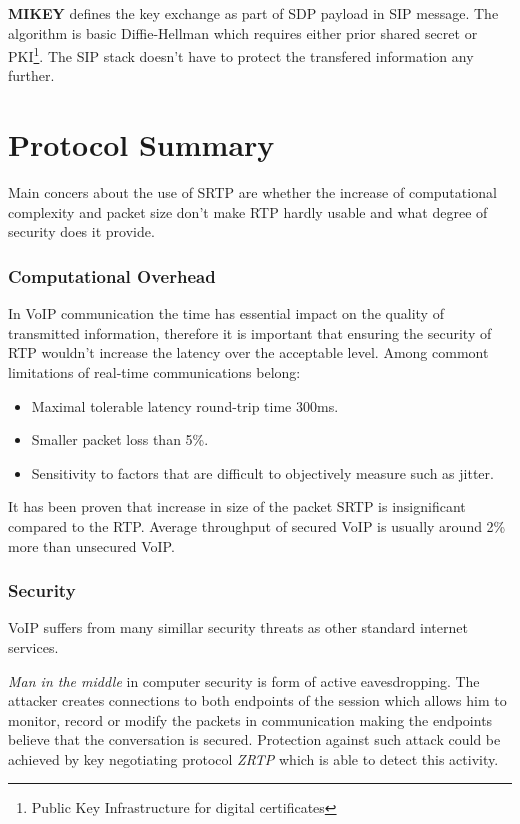 \textbf{MIKEY} defines the key exchange as part of SDP payload in SIP message.
The algorithm is basic Diffie-Hellman which requires either prior shared secret
or PKI\footnote{ Public Key Infrastructure for digital certificates}. The SIP 
stack doesn't have to protect the transfered information any further.



\section{Protocol Summary}
Main concers about the use of SRTP are whether the increase of computational
complexity and packet size don't make RTP hardly usable and what degree of
security does it provide.

\subsubsection*{Computational Overhead}
In VoIP communication the time has essential impact on the quality of
transmitted information, therefore it is important that ensuring the 
security of RTP wouldn't increase the latency over the acceptable level.
Among commont limitations of real-time communications 
belong\cite{perkins:rtp2003}:
\begin{itemize}
\item Maximal tolerable latency round-trip time 300ms.
\item Smaller packet loss than 5\%.
\item Sensitivity to factors that are difficult to objectively measure
such as jitter.
\end{itemize}



It has been proven that increase in size of the packet SRTP is
insignificant compared to the RTP\cite{srtp:analysis2, srtp:analysis1}.
Average throughput of secured VoIP is usually around 2\% more than 
unsecured VoIP.



\subsubsection*{Security}
VoIP suffers from many simillar security threats as other standard internet
services. 

\textit{Man in the middle}\label{mitm} in computer security is form of active 
eavesdropping. The attacker creates connections to both endpoints of the session
which allows him to monitor, record or modify the packets in communication 
making the endpoints believe that the conversation is secured. 
Protection against such attack could be achieved by key negotiating protocol
\textit{ZRTP} which is able to detect this activity\cite{rfc6189}.

